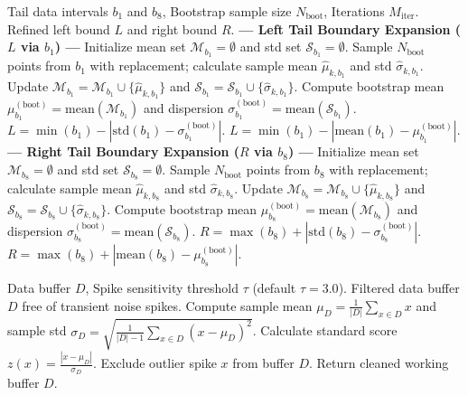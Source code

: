 \documentclass[a4paper,fleqn]{cas-sc}
\begin{document}
\begin{algorithm}[H]
\caption{Recurrent Tail Resampling for Boundaries $L$ and $R$}
\label{alg3}
\begin{algorithmic}[1]
\REQUIRE Tail data intervals $b_1$ and $b_8$, Bootstrap sample size $N_{\text{boot}}$, Iterations $M_{\text{iter}}$.
\ENSURE Refined left bound $L$ and right bound $R$.
\STATE \textbf{--- Left Tail Boundary Expansion ($L$ via $b_1$) ---}
\STATE Initialize mean set $\mathcal{M}_{b_1} = \emptyset$ and std set $\mathcal{S}_{b_1} = \emptyset$.
    \STATE Sample $N_{\text{boot}}$ points from $b_1$ with replacement; calculate sample mean $\hat{\mu}_{k,b_1}$ and std $\hat{\sigma}_{k,b_1}$.
    \STATE Update $\mathcal{M}_{b_1} = \mathcal{M}_{b_1} \cup \{\hat{\mu}_{k,b_1}\}$ and $\mathcal{S}_{b_1} = \mathcal{S}_{b_1} \cup \{\hat{\sigma}_{k,b_1}\}$.
\ENDFOR
\STATE Compute bootstrap mean $\mu_{b_1}^{(\text{boot})} = \text{mean}(\mathcal{M}_{b_1})$ and dispersion $\sigma_{b_1}^{(\text{boot})} = \text{mean}(\mathcal{S}_{b_1})$.
    \STATE $L = \min(b_1) - |\text{std}(b_1) - \sigma_{b_1}^{(\text{boot})}|$.
\ELSE
    \STATE $L = \min(b_1) - |\text{mean}(b_1) - \mu_{b_1}^{(\text{boot})}|$.
\ENDIF
\STATE \textbf{--- Right Tail Boundary Expansion ($R$ via $b_8$) ---}
\STATE Initialize mean set $\mathcal{M}_{b_8} = \emptyset$ and std set $\mathcal{S}_{b_8} = \emptyset$.
    \STATE Sample $N_{\text{boot}}$ points from $b_8$ with replacement; calculate sample mean $\hat{\mu}_{k,b_8}$ and std $\hat{\sigma}_{k,b_8}$.
    \STATE Update $\mathcal{M}_{b_8} = \mathcal{M}_{b_8} \cup \{\hat{\mu}_{k,b_8}\}$ and $\mathcal{S}_{b_8} = \mathcal{S}_{b_8} \cup \{\hat{\sigma}_{k,b_8}\}$.
\ENDFOR
\STATE Compute bootstrap mean $\mu_{b_8}^{(\text{boot})} = \text{mean}(\mathcal{M}_{b_8})$ and dispersion $\sigma_{b_8}^{(\text{boot})} = \text{mean}(\mathcal{S}_{b_8})$.
    \STATE $R = \max(b_8) + |\text{std}(b_8) - \sigma_{b_8}^{(\text{boot})}|$.
\ELSE
    \STATE $R = \max(b_8) + |\text{mean}(b_8) - \mu_{b_8}^{(\text{boot})}|$.
\ENDIF
\end{algorithmic}
\end{algorithm}

\begin{algorithm}[H]
\caption{Z-Score Outlier Spike Filtering for Contaminated Streams}
\label{alg4}
\begin{algorithmic}[1]
\REQUIRE Data buffer $D$, Spike sensitivity threshold $\tau$ (default $\tau = 3.0$).
\ENSURE Filtered data buffer $D$ free of transient noise spikes.
\STATE Compute sample mean $\mu_D = \frac{1}{|D|}\sum_{x \in D} x$ and sample std $\sigma_D = \sqrt{\frac{1}{|D|-1}\sum_{x \in D}(x - \mu_D)^2}$.
    \STATE Calculate standard score $z(x) = \frac{|x - \mu_D|}{\sigma_D}$.
        \STATE Exclude outlier spike $x$ from buffer $D$.
    \ENDIF
\ENDFOR
\STATE Return cleaned working buffer $D$.
\end{algorithmic}
\end{algorithm}
\end{document}
